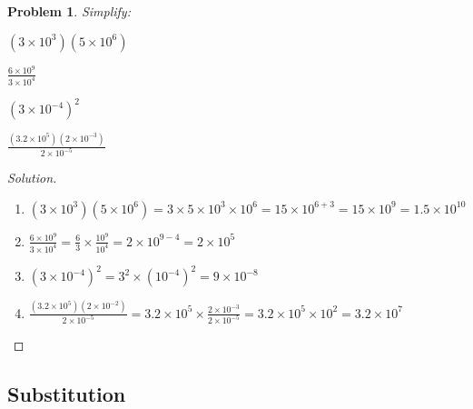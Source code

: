 \documentclass{article}
\theoremstyle{mystyle}
\newtheorem{problem}{Problem}[section]
\begin{document}
\begin{problem}
Simplify:
\begin{enumerate}
    \begin{multicols}{4}
    \item $(3\times 10^3)(5\times 10^6)$
    \item $\frac{6\times 10^9}{3\times 10^4}$
    \item $(3\times 10^{-4})^{2}$
    \item $\frac{(3.2\times 10^{5})(2\times 10^{-3})}{2\times 10^{-5}}$
    \end{multicols}
\end{enumerate}
\end{problem}
\begin{proof}[Solution]
\
\begin{enumerate}
    \item $(3\times 10^3)(5\times 10^6) = 3\times 5 \times 10^3 \times 10^6 = 15 \times 10^{6+3} = 15\times 10^9 = \boxed{1.5\times 10^{10}}$
    \item $\frac{6\times 10^9}{3\times 10^4} =  \frac{6}{3}\times \frac{10^9}{10^4} = 2\times 10^{9-4} = \boxed{2\times 10^5}$
    \item $(3\times 10^{-4})^2 = 3^2 \times (10^{-4})^2 = \boxed{9\times 10^{-8}}$
    \item $\frac{(3.2\times 10^{5})(2\times 10^{-2})}{2\times 10^{-5}} = 3.2\times 10^{5} \times \frac{2\times 10^{-3}}{2\times 10^{-5}} = 3.2 \times 10^{5}\times 10^{2} = \boxed{3.2\times 10^{7}}$
\end{enumerate}
\end{proof}
\subsection{Substitution}
\end{document}
